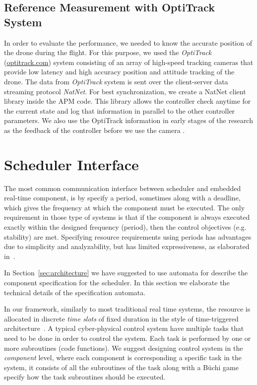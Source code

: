 \documentclass[ twoside, 12pt ]{article}
\begin{document}
\subsection{Reference Measurement with OptiTrack System}
In order to evaluate the performance, we needed to know the accurate position of the drone during the flight. For this purpose, we used the \textit{OptiTrack} (\url{optitrack.com}) system 
consisting of an array of high-speed tracking cameras that provide low latency and high accuracy position and attitude tracking of the drone. The data from \textit{OptiTrack} system is sent over the client-server data streaming protocol \textit{NatNet}.
For best synchronization, we create a NatNet client library inside the APM code. This library allows the controller check anytime for the current state and log that information in parallel to the other controller parameters.
We also use the OptiTrack information in early stages of the research as the feedback of the controller before we use the camera .

\section{Scheduler Interface}
\label{sec:scheduler}


The most common communication interface between scheduler and embedded real-time component, is by specify a period, sometimes along with a deadline, which gives the frequency at which the component must be executed.
The only requirement in those type of systems is that if the component is always executed exactly within the designed frequency (period), then the control objectives (e.g. stability) are met.
Specifying resource requirements using periods has advantages due to simplicity and analyzability, but has limited expressiveness, as elaborated in~\cite{RTComposer}. 

In Section~\ref{sec:architecture} we have suggested to use automata for describe the component specification for the scheduler. In this section we elaborate the technical details of the specification automata.

In our framework, similarly to most traditional real time systems, the resource is allocated in discrete \textit{time slots} of fixed duration in the style of time-triggered architecture~\cite{RTComposer}.
A typical cyber-physical control system have multiple tasks that need to be done in order to control the system.
Each task is performed by one or more subroutines (code functions).
We suggest designing control system in the \textit{component} level, where each component is corresponding a specific task in the system, it consists of all the subroutines of the task along with a B\"uchi game specify how the task subroutines should be executed. 
\end{document}
